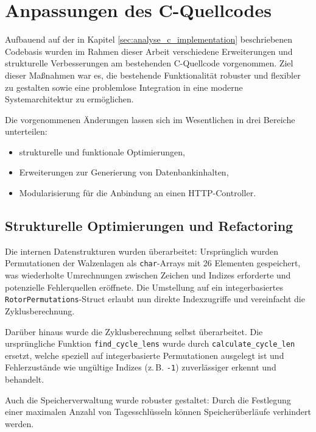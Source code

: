 \documentclass[12pt, ngerman, a4paper, numbers=noenddot]{article}
\begin{document}
\newpage
\section{Anpassungen des C-Quellcodes}
\label{sec:c_modifications}

Aufbauend auf der in Kapitel \ref{sec:analyse_c_implementation} beschriebenen Codebasis wurden im Rahmen dieser Arbeit verschiedene Erweiterungen und strukturelle Verbesserungen am bestehenden C-Quellcode vorgenommen. Ziel dieser Maßnahmen war es, die bestehende Funktionalität robuster und flexibler zu gestalten sowie eine problemlose Integration in eine moderne Systemarchitektur zu ermöglichen.

Die vorgenommenen Änderungen lassen sich im Wesentlichen in drei Bereiche unterteilen:
\begin{itemize}
	\item strukturelle und funktionale Optimierungen,
	\item Erweiterungen zur Generierung von Datenbankinhalten,
	\item Modularisierung für die Anbindung an einen HTTP-Controller.
\end{itemize}



\subsection{Strukturelle Optimierungen und Refactoring}
\label{subsec:c_structural}

Die internen Datenstrukturen wurden überarbeitet: Ursprünglich wurden Permutationen der Walzenlagen als \lstinline|char|-Arrays mit 26 Elementen gespeichert, was wiederholte Umrechnungen zwischen Zeichen und Indizes erforderte und potenzielle Fehlerquellen eröffnete. Die Umstellung auf ein integerbasiertes \lstinline|RotorPermutations|-Struct erlaubt nun direkte Indexzugriffe und vereinfacht die Zyklusberechnung.

Darüber hinaus wurde die Zyklusberechnung selbst überarbeitet. Die ursprüngliche Funktion \lstinline|find_cycle_lens| wurde durch \lstinline|calculate_cycle_len| ersetzt, welche speziell auf integerbasierte Permutationen ausgelegt ist und Fehlerzustände wie ungültige Indizes (z.\,B. \lstinline|-1|) zuverlässiger erkennt und behandelt. 

Auch die Speicherverwaltung wurde robuster gestaltet: Durch die Festlegung einer maximalen Anzahl von Tagesschlüsseln können Speicherüberläufe verhindert werden. 
\end{document}

